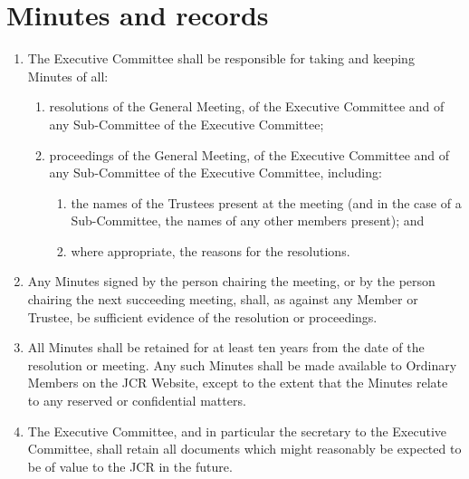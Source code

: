 \documentclass[11pt,a4paper, oneside]{memoir}
\begin{document}
	\section{Minutes and records}
	\label{Art:Minutes}
	\begin{enumerate}
		\item The Executive Committee shall be responsible for taking and keeping Minutes of all:
		\begin{enumerate}
			\item resolutions of the General Meeting, of the Executive Committee and of any Sub-Committee of the Executive Committee;
			\item proceedings of the General Meeting, of the Executive Committee and of any Sub-Committee of the Executive Committee, including:
			\begin{enumerate}
				\item the names of the Trustees present at the meeting (and in the case of a Sub-Committee, the names of any other members present); and
				\item where appropriate, the reasons for the resolutions.
			\end{enumerate}
		\end{enumerate}
			\item Any Minutes signed by the person chairing the meeting, or by the person chairing the next succeeding meeting, shall, as against any Member or Trustee, be sufficient evidence of the resolution or proceedings.
			\item All Minutes shall be retained for at least ten years from the date of the resolution or meeting.  Any such Minutes shall be made available to Ordinary Members on the JCR Website, except to the extent that the Minutes relate to any reserved or confidential matters.
			\item The Executive Committee, and in particular the secretary to the Executive Committee, shall retain all documents which might reasonably be expected to be of value to the JCR in the future.
	\end{enumerate}
\end{document}
